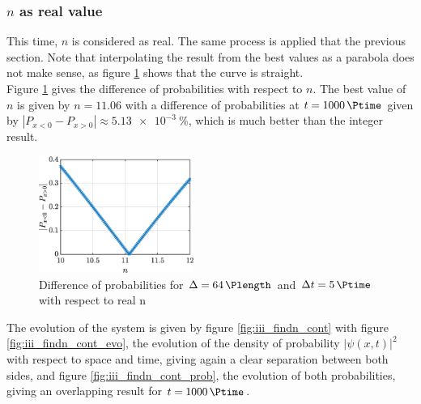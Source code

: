 \documentclass[a4paper,12pt,twoside]{article}
\newcommand{\abs}[1]{\left|#1\right|}
\begin{document}
    \subsubsection{$n$ as real value}
      This time, $n$ is considered as real.
      The same process is applied that the previous section.
      Note that interpolating the result from the best values as a parabola does not make sense, as figure \ref{fig:iii_findn_cont_n} shows that the curve is straight.\\

      Figure \ref{fig:iii_findn_cont_n} gives the difference of probabilities with respect to $n$.
      The best value of $n$ is given by $n=\num{11.06}$ with a difference of probabilities at $t=\SI{1000}{\Ptime}$ given by $\abs{P_{x<0} - P_{x>0}} \approx \SI{5.13e-3}{\percent}$, which is much better than the integer result.\\

      \begin{figure}[h]
        \centering
        \includegraphics[width=0.45\textwidth]{graphs/iii_findn_cont_n.eps}
        \caption{Difference of probabilities for $\Delta = \SI{64}{\Plength}$ and $\Delta t = \SI{5}{\Ptime}$ with respect to real n}
        \label{fig:iii_findn_cont_n}
      \end{figure}

      The evolution of the system is given by figure \ref{fig:iii_findn_cont} with figure \ref{fig:iii_findn_cont_evo}, the evolution of the density of probability $\abs{\psi(x,t)}^2$ with respect to space and time, giving again a clear separation between both sides, and figure \ref{fig:iii_findn_cont_prob}, the evolution of both probabilities, giving an overlapping result for $t=\SI{1000}{\Ptime}$.\\
\end{document}
